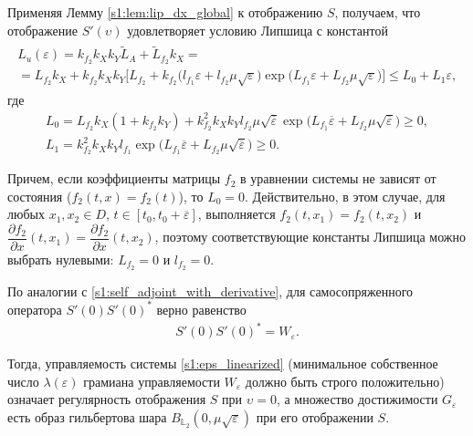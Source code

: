 \documentclass[../main.tex]{subfiles}
\begin{document}
 Применяя Лемму \ref{s1:lem:lip_dx_global} к отображению $S$, получаем, что отображение $S'(\upsilon)$ удовлетворяет условию Липшица с константой 
 \begin{gather}\label{s1:lip_eps}
 \begin{gathered}
 	 L_u(\varepsilon) = k_{f_2} k_X k_Y \widetilde{L}_A + \widetilde{L}_{f_2} k_X = \\ = 
 	L_{f_2} k_X + 
 	k_{f_2} k_X k_Y \Big[ L_{f_2} + k_{f_2} \Big( l_{f_1} \varepsilon + l_{f_2} \mu \sqrt{\varepsilon} \Big) \exp\big( L_{f_1} \varepsilon + L_{f_2} \mu \sqrt{\varepsilon} \big) \Big] \leqslant 
 	L_0 + L_1 \varepsilon,
 \end{gathered}
 \end{gather} 
 где 
 \begin{gather*}
 	L_0 = L_{f_2} k_X (1 + k_{f_2} k_Y) + 
 	k_{f_2}^2 k_X k_Y l_{f_2} \mu \sqrt{\overline{\varepsilon}} \exp\big( L_{f_1} \overline{\varepsilon} + L_{f_2} \mu \sqrt{\overline{\varepsilon}} \big) \geqslant 0, \\
 	 L_1 = k_{f_2}^2 k_X k_Y l_{f_1} \exp\big( L_{f_1} \overline{\varepsilon} + L_{f_2} \mu \sqrt{\overline{\varepsilon}} \big) \geqslant 0.
 \end{gather*} 
 
 Причем, если коэффициенты матрицы $f_2$ в уравнении системы не зависят от состояния ($f_2(t,x) = f_2(t)$), то $L_0 = 0$. 
Действительно, в этом случае, для любых $x_1, x_2 \in D$, $t\in [t_0, t_0 + \overline{\varepsilon}]$, выполняется $f_2(t,x_1) = f_2(t, x_2)$ и $\dfrac{\partial f_2}{\partial x} (t, x_1) = \dfrac{\partial f_2}{\partial x} (t, x_2)$, поэтому соответствующие константы Липшица можно выбрать нулевыми: $ L_{f_2} = 0$ и $l_{f_2} = 0$.
 
По аналогии с \eqref{s1:self_adjoint_with_derivative}, для самосопряженного оператора $S'(0)S'(0)^*$ верно равенство 
\begin{gather*}
	S'(0)S'(0)^* = W_{\varepsilon}. 
\end{gather*}
 
Тогда, управляемость системы \eqref{s1:eps_linearized} (минимальное собственное число $ \lambda(\varepsilon) $ грамиана управляемости $W_{\varepsilon}$ должно быть строго положительно) означает регулярность отображения $S$ при $\upsilon = 0$, а множество достижимости $G_{\varepsilon}$ есть образ гильбертова шара $B_{\mathbb{L}_2}(0,\mu\sqrt{\varepsilon})$ при его отображении $S$.
 
\end{document}
